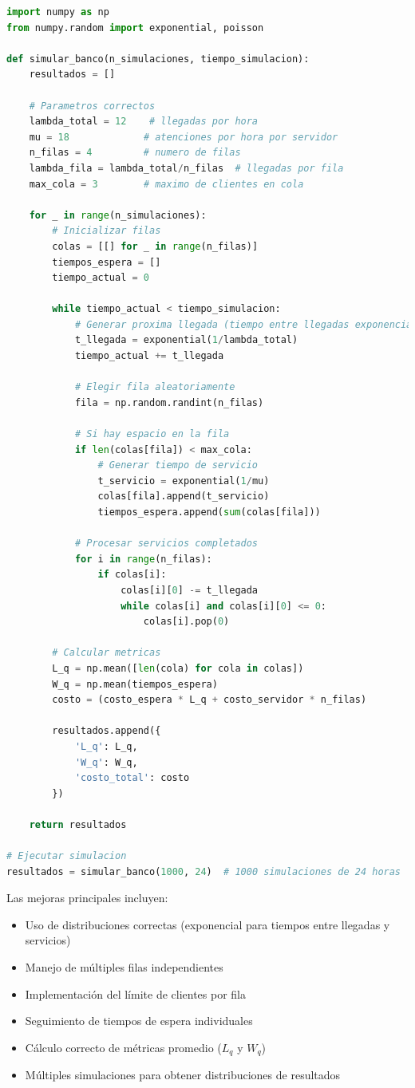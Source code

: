 \documentclass[12pt]{article}
\begin{document}
\begin{lstlisting}[language=Python]
import numpy as np
from numpy.random import exponential, poisson

def simular_banco(n_simulaciones, tiempo_simulacion):
    resultados = []
    
    # Parametros correctos
    lambda_total = 12    # llegadas por hora
    mu = 18             # atenciones por hora por servidor
    n_filas = 4         # numero de filas
    lambda_fila = lambda_total/n_filas  # llegadas por fila
    max_cola = 3        # maximo de clientes en cola
    
    for _ in range(n_simulaciones):
        # Inicializar filas
        colas = [[] for _ in range(n_filas)]
        tiempos_espera = []
        tiempo_actual = 0
        
        while tiempo_actual < tiempo_simulacion:
            # Generar proxima llegada (tiempo entre llegadas exponencial)
            t_llegada = exponential(1/lambda_total)
            tiempo_actual += t_llegada
            
            # Elegir fila aleatoriamente
            fila = np.random.randint(n_filas)
            
            # Si hay espacio en la fila
            if len(colas[fila]) < max_cola:
                # Generar tiempo de servicio
                t_servicio = exponential(1/mu)
                colas[fila].append(t_servicio)
                tiempos_espera.append(sum(colas[fila]))
            
            # Procesar servicios completados
            for i in range(n_filas):
                if colas[i]:
                    colas[i][0] -= t_llegada
                    while colas[i] and colas[i][0] <= 0:
                        colas[i].pop(0)
        
        # Calcular metricas
        L_q = np.mean([len(cola) for cola in colas])
        W_q = np.mean(tiempos_espera)
        costo = (costo_espera * L_q + costo_servidor * n_filas)
        
        resultados.append({
            'L_q': L_q,
            'W_q': W_q,
            'costo_total': costo
        })
    
    return resultados

# Ejecutar simulacion
resultados = simular_banco(1000, 24)  # 1000 simulaciones de 24 horas
\end{lstlisting}

Las mejoras principales incluyen:
\begin{itemize}
    \item Uso de distribuciones correctas (exponencial para tiempos entre llegadas y servicios)
    \item Manejo de múltiples filas independientes
    \item Implementación del límite de clientes por fila
    \item Seguimiento de tiempos de espera individuales
    \item Cálculo correcto de métricas promedio ($L_q$ y $W_q$)
    \item Múltiples simulaciones para obtener distribuciones de resultados
\end{itemize}
\end{document}
